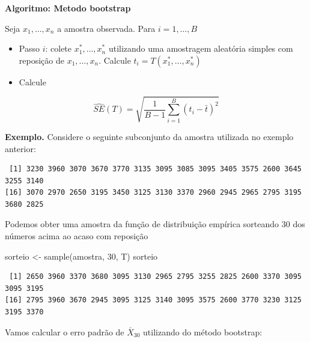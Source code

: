 \documentclass[
  letterpaper,
  DIV=11,
  numbers=noendperiod]{scrartcl}
\newenvironment{Shaded}{\begin{snugshade}}{\end{snugshade}}
\newcommand{\DecValTok}[1]{\textcolor[rgb]{0.68,0.00,0.00}{#1}}
\newcommand{\FunctionTok}[1]{\textcolor[rgb]{0.28,0.35,0.67}{#1}}
\newcommand{\NormalTok}[1]{\textcolor[rgb]{0.00,0.23,0.31}{#1}}
\newcommand{\OtherTok}[1]{\textcolor[rgb]{0.00,0.23,0.31}{#1}}
\newcommand{\SpecialCharTok}[1]{\textcolor[rgb]{0.37,0.37,0.37}{#1}}
\begin{document}
\textbf{Algoritmo: Metodo bootstrap}

Seja \(x_1,\ldots,x_n\) a amostra observada. Para \(i=1,\ldots,B\)

\begin{itemize}
\item
  Passo \(i\): colete \(x_1^*,\ldots,x_n^*\) utilizando uma amostragem
  aleatória simples com reposição de \(x_1,\ldots,x_n\). Calcule
  \(t_i=T(x_1^*,\ldots,x_n^*)\)
\item
  Calcule
\end{itemize}

\[\widehat{SE}(T)=\sqrt{\frac{1}{B-1}\sum_{i=1}^B(t_i-\bar{t})^2}\]

\textbf{Exemplo.} Considere o seguinte subconjunto da amostra utilizada
no exemplo anterior:

\begin{Shaded}
\end{Shaded}

\begin{verbatim}
 [1] 3230 3960 3070 3670 3770 3135 3095 3085 3095 3405 3575 2600 3645 3255 3140
[16] 3070 2970 2650 3195 3450 3125 3130 3370 2960 2945 2965 2795 3195 3680 2825
\end{verbatim}

Podemos obter uma amostra da função de distribuição empírica sorteando
30 dos números acima ao acaso com reposição

\begin{Shaded}
\begin{Highlighting}[]
\NormalTok{sorteio }\OtherTok{\textless{}{-}} \FunctionTok{sample}\NormalTok{(amostra, }\DecValTok{30}\NormalTok{, T)}
\NormalTok{sorteio}
\end{Highlighting}
\end{Shaded}

\begin{verbatim}
 [1] 2650 3960 3370 3680 3095 3130 2965 2795 3255 2825 2600 3370 3095 3095 3195
[16] 2795 3960 3670 2945 3095 3125 3140 3095 3575 2600 3770 3230 3125 3195 3370
\end{verbatim}

Vamos calcular o erro padrão de \(\bar{X}_{30}\) utilizando do método
bootstrap:
\end{document}
